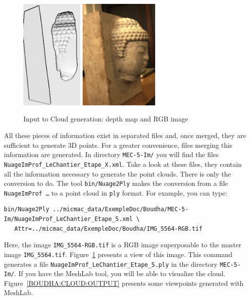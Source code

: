 \begin{figure}
\begin{center}
\includegraphics[height=55mm]{FIGS/Boudhas/FACE-Shade.jpg}
\includegraphics[height=55mm]{FIGS/Boudhas/IMG_5564-RGB.jpg}
\caption{Input to Cloud generation: depth map and RGB image}
\label{BOUDHA:CLOUD:INPUT}
\end{center}
\end{figure}


All these pieces of information exist in separated files and, once merged, they are sufficient 
to generate 3D points. For a greater convenience, files merging 
this information are generated. In directory {\tt MEC-5-Im/}
you will find the files {\tt NuageImProf\_LeChantier\_Etape\_X.xml}.
Take a look at these files, they contain all the information 
necessary to generate  the point clouds. There is only the conversion to do. 
The tool {\tt bin/Nuage2Ply} makes the conversion from
a file {\tt NuageImProf \dots} to a point cloud in {\tt ply} format.
For example, you can type:

\begin{verbatim}
bin/Nuage2Ply ../micmac_data/ExempleDoc/Boudha/MEC-5-Im/NuageImProf_LeChantier_Etape_5.xml \
   Attr=../micmac_data/ExempleDoc/Boudha/IMG_5564-RGB.tif 

\end{verbatim}

Here, the image {\tt IMG\_5564-RGB.tif} is a RGB image superposable to the master image
{\tt IMG\_5564.tif}. Figure~\ref{BOUDHA:CLOUD:INPUT} presents a view of this image. This 
command generates a file  {\tt NuageImProf\_LeChantier\_Etape\_5.ply} in the directory {\tt MEC-5-Im/}.
If you have the MeshLab tool, you will be able to visualize the cloud. Figure~\ref{BOUDHA:CLOUD:OUTPUT}
presents  some  viewpoints generated with MeshLab.
 


